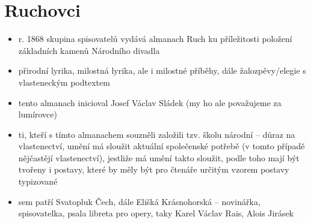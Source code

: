 \documentclass{article}
\begin{document}
\section{Ruchovci}
\begin{itemize}
  \item r. 1868 skupina spisovatelů vydává almanach Ruch ku příležitosti položení základních kamenů Národního divadla
  \item přirodní lyrika, milostná lyrika, ale i milostné příběhy, dále žalozpěvy/elegie s vlasteneckým podtextem
  \item tento almanach inicioval Josef Václav Sládek (my ho ale považujeme za lumírovce)
  \item ti, kteří s tímto almanachem souzněli založili tzv. školu národní -- důraz na vlastenectví, umění má sloužit aktuální společenské potřebě (v tomto případě nějčastějí vlastenectví), jestliže má umění takto sloužit, podle toho mají být tvořeny i postavy, které by měly být pro čtenáře určitým vzorem postavy typizované
  \item sem patří Svatopluk Čech, dále Elišká Krásnohorská -- novinářka, spisovatelka, psala libreta pro opery, taky Karel Václav Rais, Alois Jirásek
\end{itemize}
\end{document}
